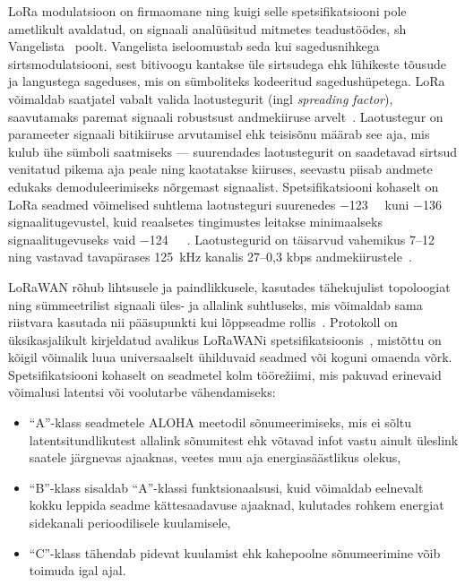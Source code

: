 \documentclass[12pt]{article}
\begin{document}
    LoRa modulatsioon on firmaomane ning kuigi selle spetsifikatsiooni pole ametlikult avaldatud, on signaali analüüsitud mitmetes teadustöödes, sh Vangelista~\cite{vangelista} poolt.
    Vangelista iseloomustab seda kui sagedusnihkega sirtsmodulatsiooni, sest bitivoogu kantakse üle sirtsudega ehk lühikeste tõusude ja langustega sageduses, mis on sümboliteks kodeeritud sagedushüpetega.
    LoRa võimaldab saatjatel vabalt valida laotustegurit (ingl \textit{spreading factor}), saavutamaks paremat signaali robustsust andmekiiruse arvelt~\cite{loramodulation}.
    Laotustegur on parameeter signaali bitikiiruse arvutamisel ehk teisisõnu määrab see aja, mis kulub ühe sümboli saatmiseks — suurendades laotustegurit on saadetavad sirtsud venitatud pikema aja peale ning kaotatakse kiiruses, seevastu piisab andmete edukaks demoduleerimiseks nõrgemast signaalist.
    Spetsifikatsiooni kohaselt on LoRa seadmed võimelised suhtlema laotusteguri suurenedes \SI{-123}{\deci\belm} kuni \SI{-136}{\deci\belm} signaalitugevustel, kuid reaalsetes tingimustes leitakse minimaalseks signaalitugevuseks vaid \SI{-124}{\deci\belm}~\cite{augustin2016study}.
    Laotustegurid on täisarvud vahemikus 7--12 ning vastavad tavapärases \SI{125}{\kilo\hertz} kanalis 27--0,3 kbps andmekiirustele~\cite{adelanto}.

    LoRaWAN rõhub lihtsusele ja paindlikkusele, kasutades tähekujulist topoloogiat ning sümmeetrilist signaali üles- ja allalink suhtluseks, mis võimaldab sama riistvara kasutada nii pääsupunkti kui lõppseadme rollis~\cite{lorawanIntro}.
    Protokoll on üksikasjalikult kirjeldatud avalikus LoRaWANi spetsifikatsioonis~\cite{lorawanspec}, mistõttu on kõigil võimalik luua universaalselt ühilduvaid seadmed või koguni omaenda võrk.
    Spetsifikatsiooni kohaselt on seadmetel kolm töörežiimi, mis pakuvad erinevaid võimalusi latentsi või voolutarbe vähendamiseks:
    \begin{itemize}
        \item “A”-klass seadmetele ALOHA meetodil sõnumeerimiseks, mis ei sõltu latentsitundlikutest allalink sõnumitest ehk võtavad infot vastu ainult üleslink saatele järgnevas ajaaknas, veetes muu aja energiasäästlikus olekus,
        \item “B”-klass sisaldab “A”-klassi funktsionaalsusi, kuid võimaldab eelnevalt kokku leppida seadme kättesaadavuse ajaaknad, kulutades rohkem energiat sidekanali perioodilisele kuulamisele,
        \item “C”-klass tähendab pidevat kuulamist ehk kahepoolne sõnumeerimine võib toimuda igal ajal.
    \end{itemize}
\end{document}
